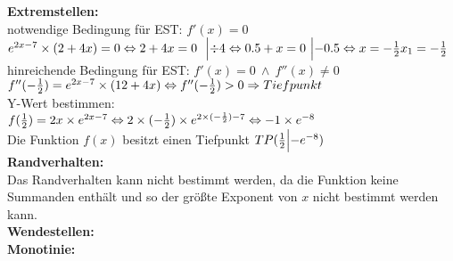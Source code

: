 \documentclass[11pt, a4paper]{report}
\begin{document}
	\textbf{Extremstellen:}
	\\
	notwendige Bedingung für EST: $f'(x) = 0$ \\
	$
	e^{2x-7} \times (2 + 4x) = 0 \\
	\Leftrightarrow 2 + 4x = 0\ \ \Bigl|\div 4 \\
	\Leftrightarrow 0.5 + x = 0\ \Bigl|-0.5\\
	\Leftrightarrow x = -\frac{1}{2} \\
	x_1 = -\frac{1}{2}
	$
	\\
	hinreichende Bedingung für EST: $f'(x) = 0\ \land\ f''(x) \ne 0$ \\
	$
	f''(-\frac{1}{2}) = e^{2x - 7} \times (12 + 4x) \\
	\Leftrightarrow f''(-\frac{1}{2}) > 0 \\
	\Rightarrow Tiefpunkt
	$
	\\
	Y-Wert bestimmen: \\
	$
	f(\frac{1}{2}) = 2x \times e^{2x-7} \\
	\Leftrightarrow 2 \times (-\frac{1}{2}) \times e^{2 \times (-\frac{1}{2}) - 7} \\
	\Leftrightarrow -1 \times e^{-8}
	$
	\\
	Die Funktion $f(x)$ besitzt einen Tiefpunkt $TP(\frac{1}{2}\Bigl|-e^{-8})$
	\\
	\textbf{Randverhalten:}
	\\
	Das Randverhalten kann nicht bestimmt werden, da die 	Funktion keine Summanden enthält und so der größte 	Exponent von $x$ nicht bestimmt werden kann.
		\\
	\textbf{Wendestellen:}
	\\
	\textbf{Monotinie:}
	\\
	
\end{document}
